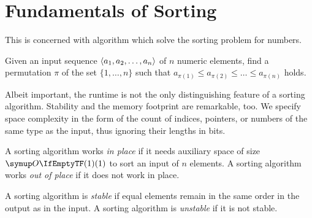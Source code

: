 \section{Fundamentals of Sorting}
\label{sec:prereq:sorting}

This  is concerned with algorithm which solve the sorting problem for numbers.
\begin{problem}[Sorting]
	Given an input sequence \(\langle a_1, a_2, \dots, a_n \rangle\) of \(n\) numeric elements, find a permutation \(\pi\) of the set \(\{ 1, \dots, n \}\) such that \(a_{\pi(1)} \le a_{\pi(2)} \le \dots \le a_{\pi(n)}\) holds.
\end{problem}
Albeit important, the runtime is not the only distinguishing feature of a sorting algorithm.
Stability and the memory footprint are remarkable, too.
We specify space complexity in the form of the count of indices, pointers, or numbers of the same type as the input, thus ignoring their lengths in bits.
\begin{definition}
	A sorting algorithm works \emph{in place} if it needs auxiliary space of size \(\bigoh{1}\) to sort an input of \(n\) elements.
	A sorting algorithm works \emph{out of place} if it does not work in place.
\end{definition}
\begin{definition}
	A sorting algorithm is \emph{stable} if equal elements remain in the same order in the output as in the input.
	A sorting algorithm is \emph{unstable} if it is not stable.
\end{definition}

